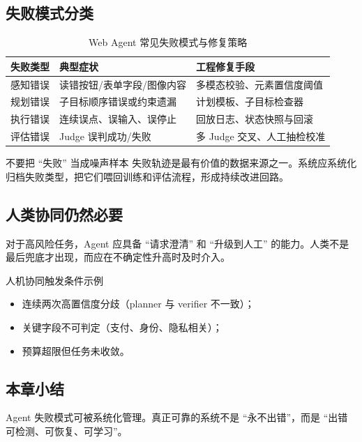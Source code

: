 \documentclass[a4paper]{article}
\begin{document}
\subsection{失败模式分类}
\begin{table}[H]
\centering
\small
\begin{tabular}{p{2.7cm}p{3.8cm}p{4.2cm}}
\toprule
\textbf{失败类型} & \textbf{典型症状} & \textbf{工程修复手段} \\
\midrule
感知错误 & 读错按钮/表单字段/图像内容 & 多模态校验、元素置信度阈值 \\
规划错误 & 子目标顺序错误或约束遗漏 & 计划模板、子目标检查器 \\
执行错误 & 连续误点、误输入、误停止 & 回放日志、状态快照与回滚 \\
评估错误 & Judge 误判成功/失败 & 多 Judge 交叉、人工抽检校准 \\
\bottomrule
\end{tabular}
\caption{Web Agent 常见失败模式与修复策略}
\end{table}

\begin{warningbox}{不要把 ``失败'' 当成噪声样本}
失败轨迹是最有价值的数据来源之一。系统应系统化归档失败类型，把它们喂回训练和评估流程，形成持续改进回路。
\end{warningbox}

\subsection{人类协同仍然必要}
对于高风险任务，Agent 应具备 ``请求澄清'' 和 ``升级到人工'' 的能力。人类不是最后兜底才出现，而应在不确定性升高时及时介入。

\begin{knowledgebox}{人机协同触发条件示例}
\begin{itemize}
    \item 连续两次高置信度分歧（planner 与 verifier 不一致）；
    \item 关键字段不可判定（支付、身份、隐私相关）；
    \item 预算超限但任务未收敛。
\end{itemize}
\end{knowledgebox}

\subsection{本章小结}
Agent 失败模式可被系统化管理。真正可靠的系统不是 ``永不出错''，而是 ``出错可检测、可恢复、可学习''。
\end{document}
